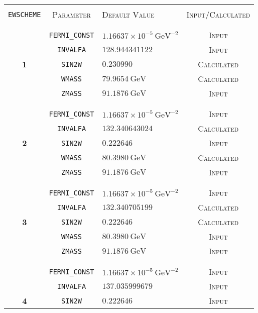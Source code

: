 \documentclass[english,12pt]{article}
\begin{document}
\begin{itemize}
\begin{table}[t!]
\newcommand{\lstrut}{{$\strut\atop\strut$}}
\begin{center}
\begin{tabular}{c|c|l|c}
\hline
&&&\\
{\tt EWSCHEME} & \textsc{Parameter} & \textsc{Default Value} & \textsc{Input/Calculated} \\
&&&\\
\hline
&&&\\
 & {\tt FERMI\_CONST} & $1.16637\times 10^{-5} \ \mathrm{GeV}^{-2}$ & \textsc{Input}\\
 & {\tt INVALFA} & $128.944341122$ & \textsc{Input}\\
\bf 1 & {\tt SIN2W} & $0.230990$ & \textsc{Calculated} \\
 & {\tt WMASS} & $79.9654 \ \mathrm{GeV}$ & \textsc{Calculated}\\
 & {\tt ZMASS} & $91.1876 \ \mathrm{GeV}$ & \textsc{Input}\\
&&&\\
\hline
&&&\\
 & {\tt FERMI\_CONST} & $1.16637 \times 10^{-5} \ \mathrm{GeV}^{-2}$ & \textsc{Input}\\
 & {\tt INVALFA} & $132.340643024$ & \textsc{Calculated}\\
\bf 2 & {\tt SIN2W} & $0.222646$ & \textsc{Input}\\
 & {\tt WMASS} & $ 80.3980 \ \mathrm{GeV}$ & \textsc{Calculated}\\
 & {\tt ZMASS} & $91.1876 \ \mathrm{GeV}$ & \textsc{Input}\\
&&&\\
\hline
&&&\\
 &{\tt FERMI\_CONST} & $1.16637 \times 10^{-5} \ \mathrm{GeV}^{-2}$ & \textsc{Input}\\
 &{\tt INVALFA} & $132.340705199$ & \textsc{Calculated}\\
\bf 3 &{\tt SIN2W} & $0.222646$ & \textsc{Calculated}\\
 &{\tt WMASS} & $80.3980 \ \mathrm{GeV}$ & \textsc{Input}\\
 & {\tt ZMASS} & $91.1876 \ \mathrm{GeV}$ & \textsc{Input}\\
&&&\\
\hline
&&&\\
 &{\tt  FERMI\_CONST} & $1.16637 \times 10^{-5} \ \mathrm{GeV}^{-2}$ & \textsc{Input}\\
 &{\tt  INVALFA} & $137.035999679$ & \textsc{Input}\\
\bf 4 &{\tt  SIN2W} & $0.222646$ & \textsc{Input}\\

\end{tabular}
\end{center}
\end{table}
\end{itemize}
\end{document}
